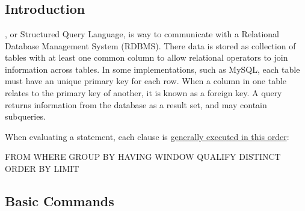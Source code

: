 \chapter{\sql}
\label{sql}

\section{Introduction}
\label{sql:intro}

\sql, or Structured Query Language, is way to
communicate with a Relational Database Management System (RDBMS).
There data is stored as collection of tables with
at least one common column to allow relational operators
to join information across tables.
In some \sql implementations, such as MySQL, each table must have an unique primary key for each row.
When a column in one table relates to the primary key of another, it is known as a foreign key.
A \sql query returns information from the database as a result set, and may contain subqueries.

When evaluating a \sql statement, each clause is
\href{https://cloud.google.com/bigquery/docs/reference/standard-sql/query-syntax#where_clause}{generally executed in this order}:

\begin{SQLcode}
FROM
WHERE
GROUP BY
HAVING
WINDOW
QUALIFY
DISTINCT
ORDER BY
LIMIT
\end{SQLcode}

\section{Basic Commands}
\label{sql:basic}

